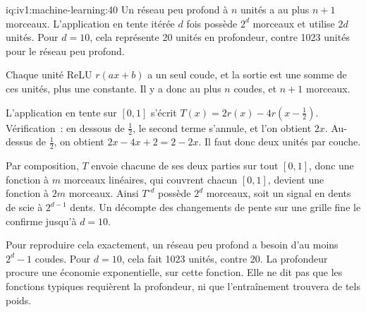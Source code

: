 \begin{solution}{iq:iv1:machine-learning:40}
Un réseau peu profond à $n$ unités a au plus $n + 1$ morceaux. L'application en tente itérée $d$ fois possède $2^d$ morceaux et utilise $2d$ unités. Pour $d = 10$, cela représente 20 unités en profondeur, contre 1023 unités pour le réseau peu profond.

Chaque unité ReLU $r(a x + b)$ a un seul coude, et la sortie est une somme de ces unités, plus une constante. Il y a donc au plus $n$ coudes, et $n + 1$ morceaux.

L'application en tente sur $[0, 1]$ s'écrit $T(x) = 2r(x) - 4r(x - \frac12)$. Vérification~: en dessous de $\frac12$, le second terme s'annule, et l'on obtient $2x$. Au-dessus de $\frac12$, on obtient $2x - 4x + 2 = 2 - 2x$. Il faut donc deux unités par couche.

Par composition, $T$ envoie chacune de ses deux parties sur tout $[0, 1]$, donc une fonction à $m$ morceaux linéaires, qui couvrent chacun $[0, 1]$, devient une fonction à $2m$ morceaux. Ainsi $T^{\circ d}$ possède $2^d$ morceaux, soit un signal en dents de scie à $2^{d - 1}$ dents. Un décompte des changements de pente sur une grille fine le confirme jusqu'à $d = 10$.

Pour reproduire cela exactement, un réseau peu profond a besoin d'au moins $2^d - 1$ coudes. Pour $d = 10$, cela fait 1023 unités, contre 20. La profondeur procure une économie exponentielle, sur cette fonction. Elle ne dit pas que les fonctions typiques requièrent la profondeur, ni que l'entraînement trouvera de tels poids.



\end{solution}

